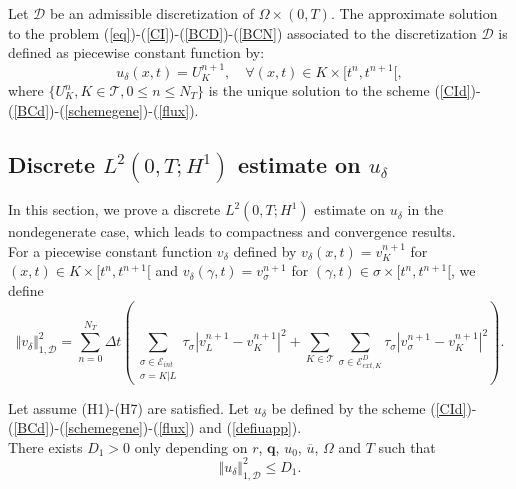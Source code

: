 \documentclass[smallextended]{svjour3}
\begin{document}
\begin{definition}
Let $ \mathcal{D}$ be an admissible discretization of $ \Omega \times (0,T)$. The approximate solution to the problem (\ref{eq})-(\ref{CI})-(\ref{BCD})-(\ref{BCN}) associated to the discretization $\mathcal{D}$ is defined as piecewise constant function by:
\begin{equation}
u_{\delta}(x,t) =  U^{n+1}_{K},  \quad \forall(x,t)\in K\times[t^{n},t^{n+1}[, \label{defiuapp}
\end{equation}
where $ \lbrace U^{n}_{K},K \in \mathcal{T},0\leq n \leq N_{T}\rbrace $ is the unique solution to the scheme (\ref{CId})-(\ref{BCd})-(\ref{schemegene})-(\ref{flux}).
\end{definition}


\subsection{Discrete $L^{2}\left(0,T;H^{1}\right)$ estimate on $u_{\delta}$}

In this section, we prove a discrete $L^{2}\left(0,T;H^{1}\right)$ estimate on $u_{\delta}$ in the nondegenerate case, which leads to compactness and convergence results.\\
For a piecewise constant function $v_{\delta}$ defined by $v_{\delta}(x,t)=v_{K}^{n+1}$ for $(x,t) \in K \times [t^{n},t^{n+1}[$ and $v_{\delta}(\gamma,t)=v_{\sigma}^{n+1}$ for $(\gamma,t) \in \sigma \times [t^{n},t^{n+1}[$, we define
\begin{equation*}
\Vert v_{\delta} \Vert_{1,\mathcal{D}}^{2}=\sum_{n=0}^{N_{T}}\Delta t\left( \sum_{\substack{\sigma \in \mathcal{E}_{int} \\ \sigma=K|L}} \tau_{\sigma} \left\vert v^{n+1}_{L}-v^{n+1}_{K}\right\vert^{2} + \sum_{K \in \mathcal{T}}\sum_{\sigma \in \mathcal{E}_{ext,K}^{D}} \tau_{\sigma} \left\vert v^{n+1}_{\sigma}-v^{n+1}_{K}\right\vert^{2} \right).
\end{equation*} 


\begin{proposition}
\label{propestiml2}
Let assume (H1)-(H7) are satisfied. Let $u_{\delta}$ be defined by the scheme (\ref{CId})-(\ref{BCd})-(\ref{schemegene})-(\ref{flux}) and (\ref{defiuapp}).\\
There exists $D_{1}>0$ only depending on $r$, $\textbf{q}$, $u_{0}$, $\overline{u}$, $\Omega$ and $T$ such that
\begin{equation}
\Vert u_{\delta} \Vert_{1,\mathcal{D}}^{2} \leq D_{1}.
\label{estiml2}
\end{equation}
\end{proposition}
\end{document}
